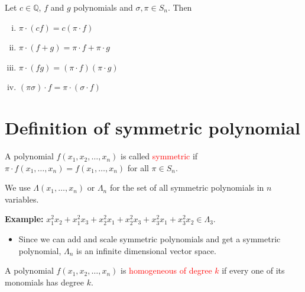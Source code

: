 \documentclass[12pt]{memoir}
\begin{document}
\begin{ptcb}
\begin{Prop}
Let $c \in \mathbb{Q}$, $f$ and $g$ polynomials and $\sigma, \pi \in S_n$. Then
\begin{enumerate}[(i)]
    \item $\pi \cdot (cf) = c(\pi \cdot f)$
    \item $\pi \cdot (f + g) = \pi \cdot f + \pi \cdot g$
    \item $\pi \cdot (fg) = (\pi \cdot f)(\pi \cdot g)$
    \item $(\pi \sigma) \cdot f = \pi \cdot (\sigma \cdot f)$
\end{enumerate}
\end{Prop}
\end{ptcb}

\newpage

\section{Definition of symmetric polynomial}

\begin{ptcb}
\begin{Def}
A polynomial $f(x_1, x_2, \dots, x_n)$ is called \textcolor{red}{symmetric} if $\pi \cdot f(x_1, \dots, x_n) = f(x_1, \dots, x_n)$ for all $\pi \in S_n$.
\end{Def}
\end{ptcb}

We use $\Lambda(x_1, \dots, x_n)$ or $\Lambda_n$ for the set of all symmetric polynomials in $n$ variables.

\textbf{Example:} $x_1^2 x_2 + x_1^2 x_3 + x_2^2 x_1 + x_2^2 x_3 + x_3^2 x_1 + x_3^2 x_2 \in \Lambda_3$.

\begin{itemize}[label=$\diamond$]
    \item Since we can add and scale symmetric polynomials and get a symmetric polynomial, $\Lambda_n$ is an infinite dimensional vector space.
\end{itemize}

\begin{ptcb}
\begin{Def}
A polynomial $f(x_1, x_2, \dots, x_n)$ is \textcolor{red}{homogeneous of degree $k$} if every one of its monomials has degree $k$.
\end{Def}
\end{ptcb}
\end{document}
